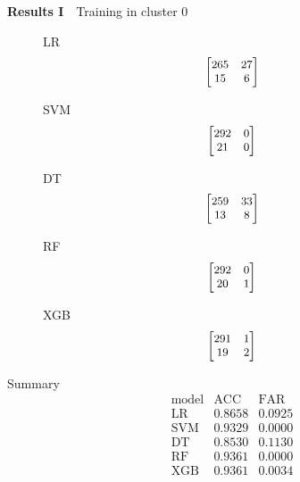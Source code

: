 \documentclass[12pt,aspectratio=43]{beamer}
\begin{document}
\begin{frame}{\textbf{Results I}　{Training in cluster 0}}
\linespread{0.9}
{\small
\begin{figure}[h]
\centering

\begin{minipage}{0.28\linewidth}
\raggedright
{\small LR}
$$
\small
\begin{bmatrix}
265 & 27 \\
15  & 6
\end{bmatrix}
$$
\end{minipage}
\begin{minipage}{0.28\linewidth}
\raggedright
{\small SVM}
$$
\small
\begin{bmatrix}
292 & 0 \\
21  & 0
\end{bmatrix}
$$
\end{minipage}
\begin{minipage}{0.28\linewidth}
\raggedright
{\small DT}
$$
\small
\begin{bmatrix}
259 & 33 \\
13  & 8
\end{bmatrix}
$$
\end{minipage}

\vspace{0.5em}

\begin{minipage}{0.28\linewidth}
\raggedright
{\small RF}
$$
\small
\begin{bmatrix}
292 & 0 \\
20  & 1
\end{bmatrix}
$$
\end{minipage}
\begin{minipage}{0.28\linewidth}
\raggedright
{\small XGB}
$$
\small
\begin{bmatrix}
291 & 1 \\
19  & 2
\end{bmatrix}
$$
\end{minipage}

\end{figure}
}

{\small
Summary
$$
\begin{array}{l|cc}
\text{model} & \text{ACC} & \text{FAR} \\
\hline
\text{LR} & 0.8658 & 0.0925 \\
\text{SVM}           & 0.9329 & 0.0000 \\
\text{DT}       & 0.8530 & 0.1130 \\
\text{RF}       & 0.9361 & 0.0000 \\
\text{XGB}            & 0.9361 & 0.0034 \\
\end{array}
$$
}

\end{frame}
\end{document}
